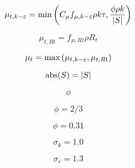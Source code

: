 {\newpage\clearpage
{}%
\begin{displaymath}
\mu_{t,k-\varepsilon} = {\rm min} \left( C_{\mu} f_{\mu,k-\varepsilon} \rho k \tau,
  \frac{\phi \rho k}{|S|} \right)
\end{displaymath}%
\lthtmldisplayZ
\lthtmlcheckvsize\clearpage}

{\newpage\clearpage
{}%
\begin{displaymath}
\mu_{t,Rt} = f_{\mu,Rt} \rho R_t
\end{displaymath}%
\lthtmldisplayZ
\lthtmlcheckvsize\clearpage}

{\newpage\clearpage
{}%
\begin{displaymath}
\mu_t = {\rm max} \left( \mu_{t,k-\varepsilon},\mu_{t,Rt} \right)
\end{displaymath}%
\lthtmldisplayZ
\lthtmlcheckvsize\clearpage}

{\newpage\clearpage
{}%
\begin{displaymath}
{\rm abs}(S) = |S|
\end{displaymath}%
\lthtmldisplayZ
\lthtmlcheckvsize\clearpage}

{\newpage\clearpage
{}%
\begin{displaymath}
\phi
\end{displaymath}%
\lthtmldisplayZ
\lthtmlcheckvsize\clearpage}

{\newpage\clearpage
{}%
\begin{displaymath}
\phi = 2/3
\end{displaymath}%
\lthtmldisplayZ
\lthtmlcheckvsize\clearpage}

{\newpage\clearpage
{}%
\begin{displaymath}
\phi = 0.31
\end{displaymath}%
\lthtmldisplayZ
\lthtmlcheckvsize\clearpage}

{\newpage\clearpage
{}%
\begin{displaymath}
\sigma_k = 1.0
\end{displaymath}%
\lthtmldisplayZ
\lthtmlcheckvsize\clearpage}

{\newpage\clearpage
{}%
\begin{displaymath}
\sigma_{\varepsilon} = 1.3
\end{displaymath}%
\lthtmldisplayZ
\lthtmlcheckvsize\clearpage}

